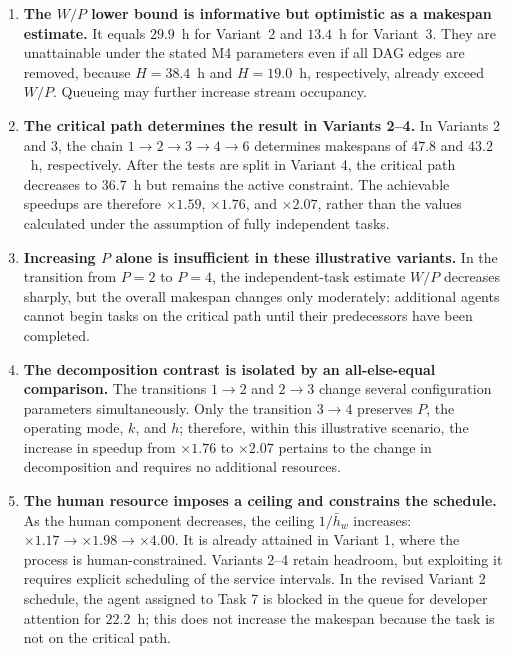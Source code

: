\begin{enumerate}
  \item \textbf{The $W/P$ lower bound is informative but optimistic as a
  makespan estimate.} It equals $29.9$~h for Variant~2 and $13.4$~h for
  Variant~3. They are unattainable under the stated M4 parameters even if all
  DAG edges are removed, because $H=38.4$~h and $H=19.0$~h, respectively,
  already exceed $W/P$. Queueing may further increase stream occupancy.

  \item \textbf{The critical path determines the result in Variants 2--4.} In
  Variants 2 and 3, the chain $1 \to 2 \to 3 \to 4 \to 6$ determines
  makespans of $47.8$ and $43.2$~h, respectively. After the tests are split in
  Variant 4, the critical path decreases to $36.7$~h but remains the active
  constraint. The achievable speedups are therefore $\times 1.59$,
  $\times 1.76$, and $\times 2.07$, rather than the values calculated under
  the assumption of fully independent tasks.

  \item \textbf{Increasing $P$ alone is insufficient in these illustrative
  variants.} In the transition from $P=2$ to $P=4$, the independent-task
  estimate $W/P$ decreases sharply, but the overall makespan changes only
  moderately: additional agents cannot begin tasks on the critical path until
  their predecessors have been completed.

  \item \textbf{The decomposition contrast is isolated by an all-else-equal
  comparison.} The transitions $1 \to 2$ and $2 \to 3$ change several
  configuration parameters simultaneously. Only the transition $3 \to 4$
  preserves $P$, the operating mode, $k$, and $h$; therefore, within this
  illustrative scenario, the increase in speedup from $\times 1.76$ to
  $\times 2.07$ pertains to the change in decomposition and requires no
  additional resources.

  \item \textbf{The human resource imposes a ceiling and constrains the
  schedule.} As the human component decreases, the ceiling $1/\bar{h}_w$
  increases: $\times 1.17 \to \times 1.98 \to \times 4.00$. It is already
  attained in Variant 1, where the process is human-constrained. Variants 2--4
  retain headroom, but exploiting it requires explicit scheduling of the
  service intervals. In the revised Variant 2 schedule, the agent assigned to
  Task 7 is blocked in the queue for developer attention for $22.2$~h; this
  does not increase the makespan because the task is not on the critical path.


\end{enumerate}
